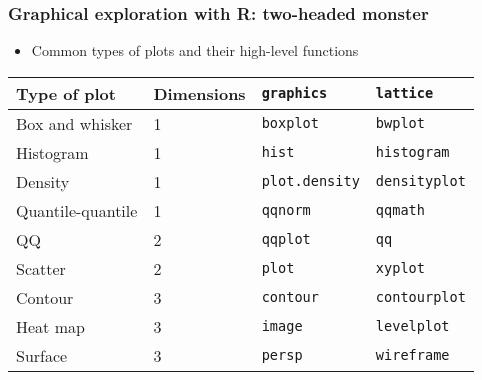 \documentclass[11pt,pdftex,dvipsnames,usenames,helvetica]{beamer}
\begin{document}
\begin{frame}[fragile]
\frametitle{Graphical exploration with R: two-headed monster}
\begin{itemize}
\item Common types of plots and their high-level functions
\end{itemize}
\begin{tabular}{l|lll}
Type of plot    & Dimensions & {\tt graphics} & {\tt lattice} \\ \hline
Box and whisker & 1 & {\tt boxplot}  & {\tt bwplot} \\
Histogram       & 1 & {\tt hist}     & {\tt histogram} \\
Density         & 1 & {\tt plot.density} & {\tt densityplot} \\
Quantile-quantile & 1 & {\tt qqnorm}   & {\tt qqmath} \\
QQ              & 2 & {\tt qqplot}   & {\tt qq} \\
Scatter         & 2 & {\tt plot} & {\tt xyplot} \\
Contour         & 3 & {\tt contour}  & {\tt contourplot} \\
Heat map        & 3 & {\tt image}    & {\tt levelplot} \\
Surface         & 3 & {\tt persp}    & {\tt wireframe} \\
\end{tabular}

\end{frame}
\end{document}
